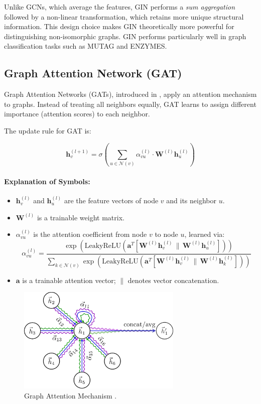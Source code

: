 \documentclass[11pt,a4paper]{article}
\begin{document}
	Unlike GCNs, which average the features, GIN performs a \emph{sum aggregation} followed by a non-linear transformation, which retains more unique structural information. This design choice makes GIN theoretically more powerful for distinguishing non-isomorphic graphs. GIN performs particularly well in graph classification tasks such as MUTAG and ENZYMES.
	
	\subsection{Graph Attention Network (GAT)}
	
	Graph Attention Networks (GATs), introduced in \cite{velivckovic2018graph}, apply an attention mechanism to graphs. Instead of treating all neighbors equally, GAT learns to assign different importance (attention scores) to each neighbor.
	
	The update rule for GAT is:
	
	\begin{equation}
		\mathbf{h}_v^{(l+1)} = \sigma\left( \sum_{u \in \mathcal{N}(v)} \alpha_{vu}^{(l)} \cdot \mathbf{W}^{(l)} \mathbf{h}_u^{(l)} \right)
	\end{equation}
	
	\paragraph{Explanation of Symbols:}
	\begin{itemize}
		\item $\mathbf{h}_v^{(l)}$ and $\mathbf{h}_u^{(l)}$ are the feature vectors of node $v$ and its neighbor $u$.
		\item $\mathbf{W}^{(l)}$ is a trainable weight matrix.
		\item $\alpha_{vu}^{(l)}$ is the attention coefficient from node $v$ to node $u$, learned via:
		\[
		\alpha_{vu}^{(l)} = \frac{
			\exp\left(\text{LeakyReLU}\left(\mathbf{a}^T [\mathbf{W}^{(l)} \mathbf{h}_v^{(l)} \, \| \, \mathbf{W}^{(l)} \mathbf{h}_u^{(l)}]\right)\right)
		}{
			\sum_{k \in \mathcal{N}(v)} \exp\left(\text{LeakyReLU}\left(\mathbf{a}^T [\mathbf{W}^{(l)} \mathbf{h}_v^{(l)} \, \| \, \mathbf{W}^{(l)} \mathbf{h}_k^{(l)}]\right)\right)
		}
		\]
		\item $\mathbf{a}$ is a trainable attention vector; $\|$ denotes vector concatenation.
	\end{itemize}
	
	\begin{figure}[h]
		\centering
		\includegraphics[width=0.7\textwidth]{gat.png}
		\caption{Graph Attention Mechanism \cite{pic:gat}.}
	\end{figure}
\end{document}
